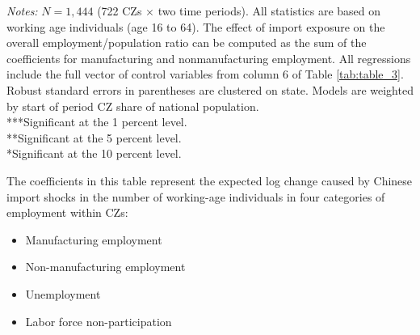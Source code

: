 \begin{frame}
\begin{table}[ht]
        \begin{minipage}{\linewidth}
            \tiny
            \textit{Notes:} $N = 1,444$ (722 CZs $\times$ two time periods). All statistics are based on working age individuals (age 16 to 64). The effect of import exposure on the overall employment/population ratio can be computed as the sum of the coefficients for manufacturing and nonmanufacturing employment. All regressions include the full vector of control variables from column 6 of Table \ref{tab:table_3}. Robust standard errors in parentheses are clustered on state. Models are weighted by start of period CZ share of national population. \\
            ***Significant at the 1 percent level. \\
            **Significant at the 5 percent level. \\
            *Significant at the 10 percent level.
        \end{minipage}
    \end{table}
    The coefficients in this table represent the expected log change caused by Chinese import shocks in the number of working-age individuals in four categories of employment within CZs: 
        
    \begin{itemize}
        \item Manufacturing employment
        \item Non-manufacturing employment
        \item Unemployment
        \item Labor force non-participation
    \end{itemize}
\end{frame}



